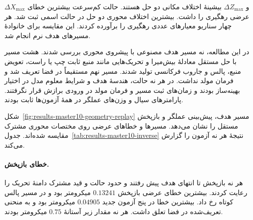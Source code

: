$\Delta X_{\max}$ و $\Delta Z_{\max}$ بیشینهٔ اختلاف مکانی دو حل هستند.
حالت کم‌سرعت بیشترین خطای عرضی رهگیری را داشت.
بیشترین اختلاف محوری دو حل در حالت اسمی ثبت شد.
هر چهار سناریو معیارهای عددی رهگیری را برآورده کردند.
این مقایسه برای خانوادهٔ مسیرهای هدف نرم انجام شد.

\clearpage
{}
\label{sec:results-master10-geometry-inverse}

در این مطالعه، نه مسیر هدف مصنوعی با پیشروی محوری بررسی شدند.
هشت مسیر با حل مستقل معادلهٔ بیش‌میرا و تحریک‌هایی مانند منبع ثابت چپ یا راست، تعویض منبع، پالس و جاروب فرکانسی تولید شدند.
مسیر نهم مستقیماً در فضا تعریف شد و فرمان مولد نداشت.
در هر نه حالت، هندسهٔ هدف و شرایط معلوم مدل در اختیار بهینه‌ساز بودند و زمان‌های ثبت مسیر و فرمان مولد در ورودی برازش قرار نگرفتند.
پارامترهای سیال و وزن‌های عملگر در همهٔ آزمون‌ها ثابت بودند.

شکل~\ref{fig:results-master10-geometry-replay} مسیر هدف، پیش‌بینی عملگر و بازپخش مستقل را نشان می‌دهد.
مسیرها و خطاهای عرضی روی مختصات محوری مشترک مقایسه شده‌اند.
جدول~\ref{tab:results-master10-inverse} نتیجهٔ هر نه آزمون را گزارش می‌کند.


\paragraph{خطای بازپخش.}
هر نه بازپخش تا انتهای هدف پیش رفتند و حدود حالت و قید مشترک دامنهٔ تحریک را رعایت کردند.
بیشترین خطای عرضی بازپخش $0.13241$ میکرومتر بود و در مسیر پالس کوتاه رخ داد.
بیشترین خطا در پنج آزمون جدید $0.04905$ میکرومتر بود و به منحنی تعریف‌شده در فضا تعلق داشت.
هر نه مقدار زیر آستانهٔ $0.75$ میکرومتر بودند.


